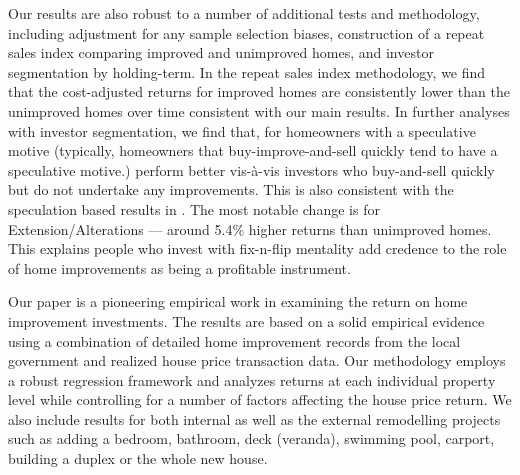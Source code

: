 \documentclass[AEJ,reqno, draftmode]{AEA} %
\begin{document}
Our results are also robust to a number of additional tests and methodology, including adjustment for any sample selection biases, construction of a repeat sales index comparing improved and unimproved homes, and investor segmentation by holding-term. In the repeat sales index methodology, we find that the cost-adjusted returns for improved homes are consistently lower than the unimproved homes over time consistent with our main results. In further analyses with investor segmentation, we find that, for homeowners with a speculative motive (typically, homeowners that buy-improve-and-sell quickly tend to have a speculative motive.) perform better vis-à-vis investors who buy-and-sell quickly but do not undertake any improvements. This is also consistent with the speculation based results in \citet{choi2014speculating}. The most notable change is for Extension/Alterations --- around 5.4\% higher returns than unimproved homes. This explains people who invest with fix-n-flip mentality add credence to the role of home improvements as being a profitable instrument.





Our paper is a pioneering empirical work in examining the return on home improvement investments. The results are based on a solid empirical evidence using a combination of detailed home improvement records from the local government and realized house price transaction data. Our methodology employs a robust regression framework and analyzes returns at each individual property level while controlling for a number of factors affecting the house price return. We also include results for both internal as well as the external remodelling projects such as adding a bedroom, bathroom, deck (veranda), swimming pool, carport, building a duplex or the whole new house.
\end{document}
